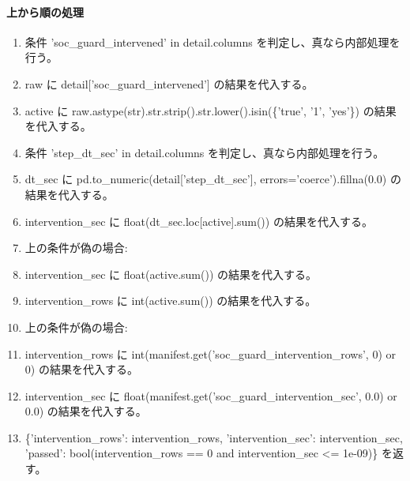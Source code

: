 \documentclass[a4paper,11pt]{article}
\begin{document}
            \paragraph{上から順の処理}
            \begin{enumerate}[leftmargin=1.8em]
            \item 条件 'soc\_guard\_intervened' in detail.columns を判定し、真なら内部処理を行う。
\item   raw に detail['soc\_guard\_intervened'] の結果を代入する。
\item   active に raw.astype(str).str.strip().str.lower().isin(\{'true', '1', 'yes'\}) の結果を代入する。
\item   条件 'step\_dt\_sec' in detail.columns を判定し、真なら内部処理を行う。
\item     dt\_sec に pd.to\_numeric(detail['step\_dt\_sec'], errors='coerce').fillna(0.0) の結果を代入する。
\item     intervention\_sec に float(dt\_sec.loc[active].sum()) の結果を代入する。
\item     上の条件が偽の場合:
\item     intervention\_sec に float(active.sum()) の結果を代入する。
\item   intervention\_rows に int(active.sum()) の結果を代入する。
\item   上の条件が偽の場合:
\item   intervention\_rows に int(manifest.get('soc\_guard\_intervention\_rows', 0) or 0) の結果を代入する。
\item   intervention\_sec に float(manifest.get('soc\_guard\_intervention\_sec', 0.0) or 0.0) の結果を代入する。
\item \{'intervention\_rows': intervention\_rows, 'intervention\_sec': intervention\_sec, 'passed': bool(intervention\_rows == 0 and intervention\_sec <= 1e-09)\} を返す。
            \end{enumerate}
\end{document}
